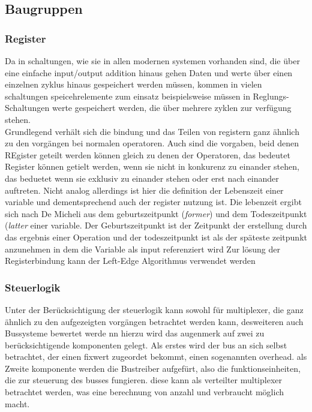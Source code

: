 \documentclass[conference]{IEEEtran}
\begin{document}
\subsection{Baugruppen}
 \subsubsection{Register}
 Da in schaltungen, wie sie in allen modernen systemen vorhanden sind, die über eine einfache input/output addition hinaus gehen Daten und werte über einen einzelnen zyklus hinaus gespeichert werden müssen, kommen in vielen schaltungen speicehrelemente zum einsatz beispielsweise müssen in Reglungs-Schaltungen werte gespeichert werden, die über mehrere zyklen zur verfügung stehen. \\
 Grundlegend verhält sich die bindung und das Teilen von registern ganz ähnlich zu den vorgängen bei normalen operatoren. Auch sind die vorgaben, beid denen REgister geteilt werden können gleich zu denen der Operatoren, das bedeutet Register können getielt werden, wenn sie nicht in konkurenz zu einander stehen, das beduetet wenn sie exklusiv zu einander stehen oder erst nach  einander auftreten. Nicht analog allerdings ist hier die definition der Lebenszeit einer variable und dementsprechend auch der register nutzung ist. Die lebenzeit ergibt sich nach De Micheli aus dem geburtszeitpunkt (\textit{former})  und dem Todeszeitpunkt (\textit{latter} einer variable. Der Geburtszeitpunkt ist der Zeitpunkt der erstellung durch das ergebnis einer Operation und der todeszeitpunkt ist als der späteste zeitpunkt anzunehmen in dem die Variable als input referenziert wird\cite[S. 240]{3}
Zur lösung der Registerbindung kann der Left-Edge Algorithmus verwendet werden \cite[S. 359]{2}\\
 \subsubsection{Steuerlogik}
 Unter der Berücksichtigung der steuerlogik kann sowohl für multiplexer, die ganz ähnlich zu den aufgezeigten vorgängen betrachtet werden kann, desweiteren auch Bussysteme bewertet werde nn hierzu wird das augenmerk auf zwei zu berücksichtigende komponenten gelegt. Als erstes wird der bus an sich selbst betrachtet, der einen fixwert zugeordet bekommt, einen sogenannten overhead.
 als Zweite komponente werden die Bustreiber aufgefürt, also die funktionseinheiten, die zur steuerung des busses fungieren. diese kann als verteilter multiplexer betrachtet werden, was eine berechnung von anzahl und verbraucht möglich macht.\cite[S. 157]{3}\\
\end{document}

